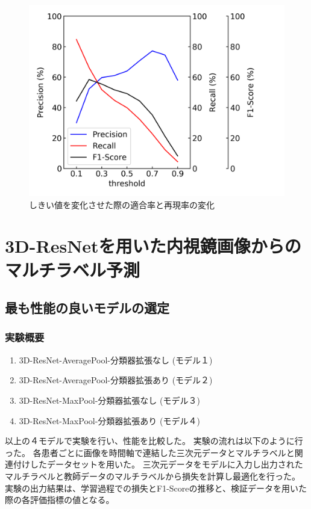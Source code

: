 \begin{figure}[htbp]
    \begin{center}
        \includegraphics[width=150mm]{./fig/densenet121threshold.png}
        \caption{しきい値を変化させた際の適合率と再現率の変化}
        \label{fig:densenet121_result_threshold}
    \end{center}
\end{figure}

\newpage
\section{3D-ResNetを用いた内視鏡画像からのマルチラベル予測}
\subsection{最も性能の良いモデルの選定}
\label{sec:ex2}
\subsubsection{実験概要}
\begin{enumerate}
    \item 3D-ResNet-AveragePool-分類器拡張なし (モデル１)
    \item 3D-ResNet-AveragePool-分類器拡張あり (モデル２)
    \item 3D-ResNet-MaxPool-分類器拡張なし (モデル３)
    \item 3D-ResNet-MaxPool-分類器拡張あり (モデル４)
\end{enumerate}
以上の４モデルで実験を行い、性能を比較した。
実験の流れは以下のように行った。
各患者ごとに画像を時間軸で連結した三次元データとマルチラベルと関連付けしたデータセットを用いた。
三次元データをモデルに入力し出力されたマルチラベルと教師データのマルチラベルから損失を計算し最適化を行った。
実験の出力結果は、学習過程での損失とF1-Scoreの推移と、検証データを用いた際の各評価指標の値となる。

